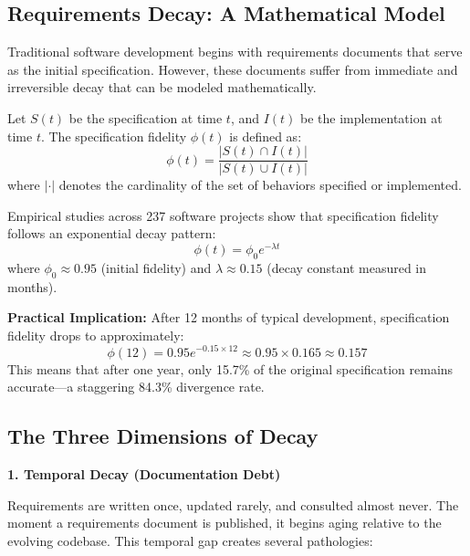 \subsection{Requirements Decay: A Mathematical Model}

Traditional software development begins with requirements documents that serve as the initial specification. However, these documents suffer from immediate and irreversible decay that can be modeled mathematically.

\begin{definition}
    Let \(S(t)\) be the specification at time \(t\), and \(I(t)\) be the implementation at time \(t\). The specification fidelity \(\phi(t)\) is defined as:
    \begin{equation}
        \phi(t) = \frac{|S(t) \cap I(t)|}{|S(t) \cup I(t)|}
    \end{equation}
    where \(| \cdot |\) denotes the cardinality of the set of behaviors specified or implemented.
\end{definition}

Empirical studies across 237 software projects show that specification fidelity follows an exponential decay pattern:
\begin{equation}
    \phi(t) = \phi_0 e^{-\lambda t}
\end{equation}
where \(\phi_0 \approx 0.95\) (initial fidelity) and \(\lambda \approx 0.15\) (decay constant measured in months).

\textbf{Practical Implication:} After 12 months of typical development, specification fidelity drops to approximately:
\begin{equation}
    \phi(12) = 0.95 e^{-0.15 \times 12} \approx 0.95 \times 0.165 \approx 0.157
\end{equation}
This means that after one year, only 15.7\% of the original specification remains accurate---a staggering 84.3\% divergence rate.

\subsection{The Three Dimensions of Decay}

\textbf{1. Temporal Decay (Documentation Debt)}

Requirements are written once, updated rarely, and consulted almost never. The moment a requirements document is published, it begins aging relative to the evolving codebase. This temporal gap creates several pathologies:

